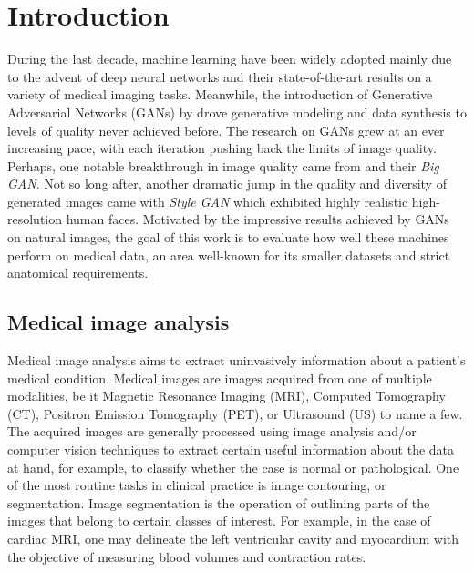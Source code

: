 \documentclass[preprint,12pt, authoryear]{elsarticle}
\begin{document}
\section{Introduction}
\label{sec:introduction}
During the last decade, machine learning have been widely adopted mainly due to the advent of deep neural networks and their state-of-the-art  results on a variety of medical imaging tasks. Meanwhile, the introduction of Generative Adversarial Networks (GANs) by \cite{Goodfellow2014GenerativeAN} drove generative modeling and data synthesis to levels of quality never achieved before.  The research on GANs grew at an ever increasing pace, with each iteration pushing back the limits of image quality.  Perhaps, one notable breakthrough in image quality came from \cite{Brock2019LargeSG} and their {\em Big GAN}.  Not so long after,  another dramatic jump in the quality and diversity of generated images came with {\em Style GAN} \citep{Karras2019ASG} which exhibited highly realistic high-resolution human faces.
Motivated by the impressive results achieved by GANs on natural images, the goal of this work is to evaluate how well these machines perform on medical data, an area well-known for its smaller datasets and strict anatomical requirements.

\subsection{Medical image analysis}
Medical image analysis aims to extract uninvasively information about a patient's medical condition. Medical images are images acquired from one of multiple modalities, be it Magnetic Resonance Imaging (MRI), Computed Tomography (CT), Positron Emission Tomography (PET), or Ultrasound (US) to name a few. The acquired images are generally processed using image analysis and/or computer vision techniques to extract certain useful information about the data at hand, for example, to classify whether the case is normal or pathological. One of the most routine tasks in clinical practice is image contouring, or segmentation. Image segmentation is the operation of outlining parts of the images that belong to certain classes of interest.  For example, in the case of cardiac MRI, one may delineate the  left ventricular cavity and myocardium with the objective of measuring blood volumes and contraction rates.
\end{document}
